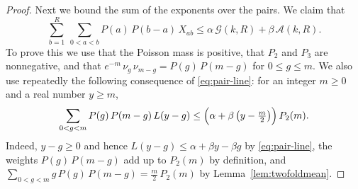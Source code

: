 \documentclass{amsart}
\theoremstyle{definition}
\theoremstyle{remark}
\numberwithin{equation}{section}
\begin{document}
\begin{proof}
Next we bound the sum of the exponents over the pairs. We claim that
\begin{equation}\label{eq:pair-exponents}
\sum_{b=1}^{R}\ \sum_{0<a<b}P(a)\,P(b-a)\,X_{ab}
\le\alpha\,\mathcal G(k,R)+\beta\,\mathcal A(k,R).
\end{equation}
To prove this we use that the Poisson mass is positive, that $P_2$ and $P_3$
are nonnegative, and that $e^{-m}\,\nu_g\,\nu_{m-g}=P(g)\,P(m-g)$ for
$0\le g\le m$. We also use repeatedly the following consequence of
\eqref{eq:pair-line}: for an integer $m\ge0$ and a real number $y\ge m$,
\begin{equation}\label{eq:pair-row}
\sum_{0<g<m}P(g)\,P(m-g)\,L(y-g)
\le\Bigl(\alpha+\beta\,\bigl(y-\tfrac m2\bigr)\Bigr)\,P_2(m).
\end{equation}
Indeed, $y-g\ge0$ and hence $L(y-g)\le\alpha+\beta y-\beta g$ by
\eqref{eq:pair-line}, the weights $P(g)\,P(m-g)$ add up to $P_2(m)$ by
definition, and
$\sum_{0<g<m}g\,P(g)\,P(m-g)=\frac m2\,P_2(m)$ by
Lemma~\ref{lem:twofoldmean}.


\end{proof}
\end{document}
